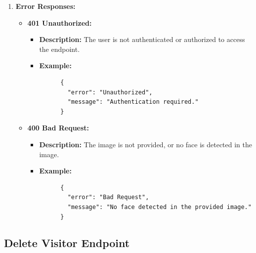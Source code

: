 \documentclass[a4 paper, 12pt]{article}
\begin{document}
\begin{enumerate}
  \item \textbf{Error Responses:}
  \begin{itemize}
    \item \textbf{401 Unauthorized:}
    \begin{itemize}
      \item \textbf{Description:} The user is not authenticated or authorized to access the endpoint.
      \item \textbf{Example:}
      \begin{verbatim}
      {
        "error": "Unauthorized",
        "message": "Authentication required."
      }
      \end{verbatim}
    \end{itemize}

    \item \textbf{400 Bad Request:}
    \begin{itemize}
      \item \textbf{Description:} The image is not provided, or no face is detected in the image.
      \item \textbf{Example:}
      \begin{verbatim}
      {
        "error": "Bad Request",
        "message": "No face detected in the provided image."
      }
      \end{verbatim}
    \end{itemize}
  \end{itemize}
\end{enumerate}

\subsection{Delete Visitor Endpoint}
\end{document}
